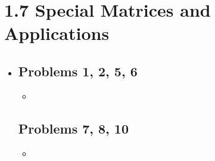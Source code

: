 \section{1.7 Special Matrices and Applications}
\begin{itemize}
  \item []

    \subsection{Problems 1, 2, 5, 6}
    \begin{itemize}
      \item
    \end{itemize}

    \subsection{Problems 7, 8, 10}
    \begin{itemize}
      \item
    \end{itemize}

\end{itemize}
